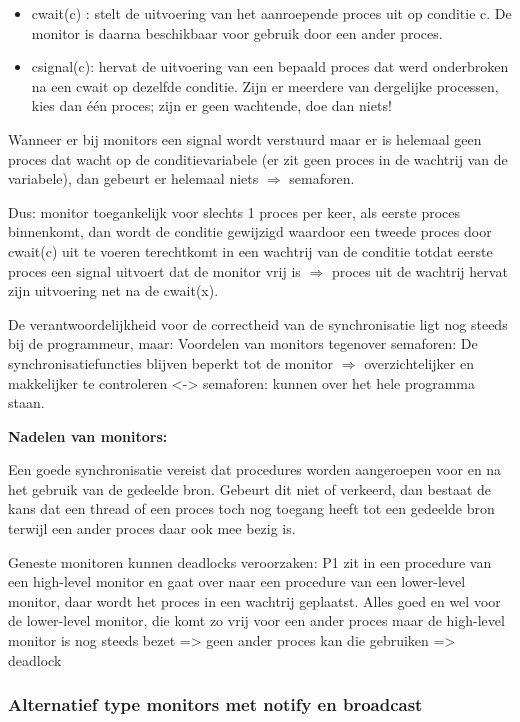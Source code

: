 \begin{itemize}
\item cwait(c) : stelt de uitvoering van het aanroepende proces uit op conditie c. De monitor is daarna beschikbaar voor gebruik door een ander proces.
\item csignal(c): hervat de uitvoering van een bepaald proces dat werd onderbroken na een cwait op dezelfde conditie. Zijn er meerdere van dergelijke processen, kies dan één proces; zijn er geen wachtende, doe dan niets!
\end{itemize}

Wanneer er bij monitors een signal wordt verstuurd maar er is helemaal geen proces dat wacht op de conditievariabele (er zit geen proces in de wachtrij van de variabele), dan gebeurt er helemaal niets $\Rightarrow$ semaforen.

Dus: monitor toegankelijk voor slechts 1 proces per keer, als eerste proces binnenkomt, dan wordt de conditie gewijzigd waardoor een tweede proces door cwait(c) uit te voeren terechtkomt in een wachtrij van de conditie totdat eerste proces een signal uitvoert dat de monitor vrij is $\Rightarrow$  proces uit de wachtrij hervat zijn uitvoering net na de cwait(x).


De verantwoordelijkheid voor de correctheid van de synchronisatie ligt nog steeds bij de programmeur, maar: Voordelen van monitors tegenover semaforen:
De synchronisatiefuncties blijven beperkt tot de monitor $\Rightarrow$  overzichtelijker en makkelijker te controleren <-> semaforen: kunnen over het hele programma staan.

\textbf{Nadelen van monitors:}

Een goede synchronisatie vereist dat procedures worden aangeroepen voor en na het gebruik van de gedeelde bron. Gebeurt dit niet of verkeerd, dan bestaat de kans dat een thread of een proces toch nog toegang heeft tot een gedeelde bron terwijl een ander proces daar ook mee bezig is.

Geneste monitoren kunnen deadlocks veroorzaken: P1 zit in een procedure van een high-level monitor en gaat over naar een procedure van een lower-level monitor, daar wordt het proces in een wachtrij geplaatst. Alles goed en wel voor de lower-level monitor, die komt zo vrij voor een ander proces maar de high-level monitor is nog steeds bezet => geen ander proces kan die gebruiken => deadlock


\subsubsection{Alternatief type monitors met notify en broadcast}


